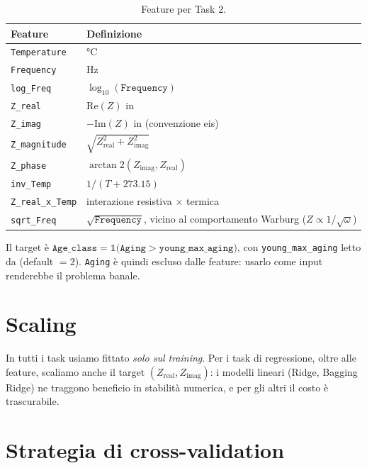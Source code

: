 \begin{table}[H]
  \centering
  \caption{Feature per Task 2.}
  \label{tab:classification-features}
  \begin{tabularx}{\linewidth}{lX}
    \toprule
    \textbf{Feature} & \textbf{Definizione} \\
    \midrule
    \texttt{Temperature} & \si{\celsius} \\
    \texttt{Frequency} & \si{\hertz} \\
    \texttt{log\_Freq} & $\log_{10}(\texttt{Frequency})$ \\
    \texttt{Z\_real} & $\mathrm{Re}(Z)$ in \milliohm{} \\
    \texttt{Z\_imag} & $-\mathrm{Im}(Z)$ in \milliohm{} (convenzione \acrshort{eis}) \\
    \texttt{Z\_magnitude} & $\sqrt{Z_\text{real}^{2} + Z_\text{imag}^{2}}$ \\
    \texttt{Z\_phase} & $\arctan2(Z_\text{imag}, Z_\text{real})$ \\
    \texttt{inv\_Temp} & $1/(T + 273.15)$ \\
    \texttt{Z\_real\_x\_Temp} & interazione resistiva $\times$ termica \\
    \texttt{sqrt\_Freq} & $\sqrt{\texttt{Frequency}}$, vicino al
                          comportamento Warburg ($Z \propto 1/\sqrt{\omega}$) \\
    \bottomrule
  \end{tabularx}
\end{table}

Il target è
$\texttt{Age\_class} = \mathbb{1}\!\big(\texttt{Aging} > \texttt{young\_max\_aging}\big)$,
con \texttt{young\_max\_aging} letto da 
(default $= 2$). \texttt{Aging} è quindi escluso dalle feature: usarlo
come input renderebbe il problema banale.

\section{Scaling}

In tutti i task usiamo  fittato \emph{solo sul
training}. Per i task di regressione, oltre alle feature, scaliamo anche
il target $(Z_\text{real}, Z_\text{imag})$: i modelli lineari (Ridge,
Bagging Ridge) ne traggono beneficio in stabilità numerica, e per gli
altri il costo è trascurabile.

\newpage
\section{Strategia di cross-validation}

